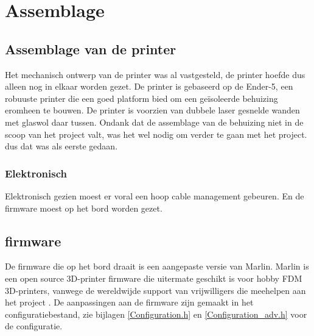 \chapter{Assemblage}
\label{Assemblage}

\section{Assemblage van de printer}

Het mechanisch ontwerp van de printer was al vastgesteld, de printer hoefde dus
alleen nog in elkaar worden gezet. De printer is gebaseerd op de Ender-5, een
robuuste printer die een goed platform bied om een geïsoleerde behuizing
eromheen te bouwen. De printer is voorzien van dubbele laser gesnelde wanden
met glaswol daar tussen. Ondank dat de assemblage van de behuizing niet in de
scoop van het project valt, was het wel nodig om verder te gaan met het
project. dus dat was als eerste gedaan.

\subsection{Elektronisch}

Elektronisch gezien moest er voral een hoop cable management gebeuren. En de
firmware moest op het bord worden gezet.

\section{firmware}

De firmware die op het bord draait is een aangepaste versie van Marlin. Marlin
is een open source 3D-printer firmware die uitermate geschikt is voor hobby FDM
3D-printers, vanwege de wereldwijde support van vrijwilligers die meehelpen aan
het project \cite{Marlin}. De aanpassingen aan de firmware zijn gemaakt in het
configuratiebestand, zie bijlagen \ref{Configuration.h} en
\ref{Configuration_adv.h} voor de configuratie.

